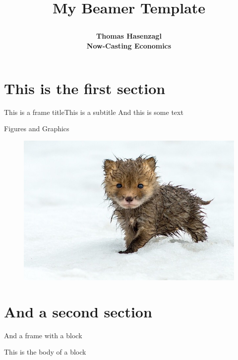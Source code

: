 \documentclass[xcolor=svgnames, 10pt, aspectratio=169]{beamer}
\title{\raggedright \color{myblue} \titlefont My Beamer Template}
\date{\raggedright\vfill \small A Cool Conference\\[4pt] May 17, 2018}
\author[shortname]{\raggedright \bf Thomas Hasenzagl \\[4pt] \normalfont \small Now-Casting Economics}
\begin{document}

\section{This is the first section} 


\begin{frame}{This is a frame title}{This is a subtitle}
    And this is some text
\end{frame}


\begin{frame}{Figures and Graphics}
    \begin{figure}
        \centering
        \includegraphics[scale=0.3]{fox}
    \end{figure}
\end{frame}


\section{And a second section}


\begin{frame}{And a frame with a block}

    \begin{tcolorbox}[title=This is the title of a block]
    This is the body of a block 
    \end{tcolorbox}

\end{frame}
\end{document}
